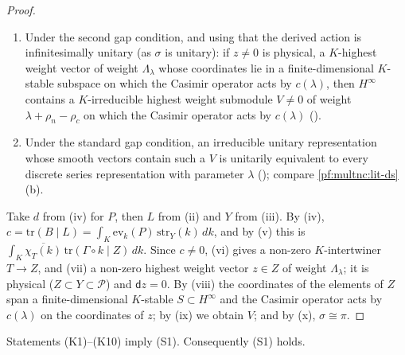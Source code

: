 \begin{proof}
\begin{enumerate}[label=(\roman*)]
$c(\lambda)$ on all coordinates of $z$ ().
\item Under the second gap condition, and using that the derived action is infinitesimally unitary (as $\sigma$ is
unitary): if $z\ne0$ is physical, a $K$-highest weight vector of weight $\Lambda_\lambda$ whose
coordinates lie in a finite-dimensional $K$-stable subspace on which the Casimir operator acts by $c(\lambda)$, then
$H^\infty$ contains a $K$-irreducible highest weight submodule $V\ne0$ of weight $\lambda+\rho_n-\rho_c$ on which the
Casimir operator acts by $c(\lambda)$ ().
\item Under the standard gap condition, an irreducible unitary representation whose smooth vectors contain such a $V$ is
unitarily equivalent to every discrete series representation with parameter $\lambda$
(); compare \cref{pf:multnc:lit-ds}(b).
\end{enumerate}
Take $d$ from (iv) for $P$, then $L$ from (ii) and $Y$ from (iii). By (iv), $c=\mathrm{tr}(B\mid L)=\int_K\mathrm{ev}_k(P)
\,\mathrm{str}_Y(k)\,dk$, and by (v) this is $\int_K\overline{\chi_T(k)}\,\mathrm{tr}(\Gamma\circ k\mid Z)\,dk$. Since
$c\ne0$, (vi) gives a non-zero $K$-intertwiner $T\to Z$, and (vii) a non-zero highest weight vector $z\in Z$ of weight
$\Lambda_\lambda$; it is physical ($Z\subset Y\subset\mathcal P$) and $\mathsf dz=0$. By (viii) the coordinates of the
elements of $Z$ span a finite-dimensional $K$-stable $S\subset H^\infty$ and the Casimir operator acts by $c(\lambda)$ on
the coordinates of $z$; by (ix) we obtain $V$; and by (x), $\sigma\cong\pi$.
\end{proof}

\begin{theorem}\label{pf:multnc:kdata}
Statements (K1)--(K10) imply (S1). Consequently (S1) holds.
\end{theorem}

